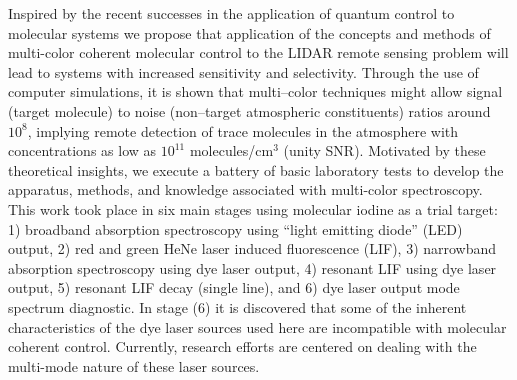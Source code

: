 Inspired by the recent successes in the application of quantum control to molecular systems \cite{Weinacht:2001a,Jeanneret:1998a,Schiemann:1993a} we propose that application of the concepts and methods of multi-color coherent molecular control to the LIDAR remote sensing problem will lead to systems with increased sensitivity and selectivity. Through the use of computer simulations, it is shown that multi--color techniques might allow signal (target molecule) to noise (non--target atmospheric constituents) ratios around $10^8$, implying remote detection of trace molecules in the atmosphere with concentrations as low as $10^{11}$ molecules/cm$^3$ (unity SNR). Motivated by these theoretical insights, we execute a battery of basic laboratory tests to develop the apparatus, methods, and knowledge associated with multi-color spectroscopy. This work took place in six main stages using molecular iodine as a trial target: 1) broadband absorption spectroscopy using ``light emitting diode'' (LED) output, 2) red and green HeNe laser induced fluorescence (LIF), 3) narrowband absorption spectroscopy using dye laser output, 4) resonant LIF using dye laser output, 5) resonant LIF decay (single line), and 6) dye laser output mode spectrum diagnostic. In stage (6) it is discovered that some of the inherent characteristics of the dye laser sources used here are incompatible with molecular coherent control. Currently, research efforts are centered on dealing with the multi-mode nature of these laser sources.

